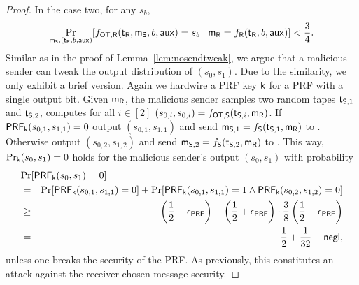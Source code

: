\begin{proof}
In the case two, for any $s_b$,
$$
\Pr_{\mathsf{m}_{\mathsf{S}}, (\mathsf{t}_{\mathsf{R}},b,\mathsf{aux})}[f_{\mathsf{OT},\mathsf{R}}(\mathsf{t}_{\mathsf{R}},\mathsf{m}_{\mathsf{S}},b,\mathsf{aux})=s_b\mid \mathsf{m}_{\mathsf{R}}=f_{\mathsf{R}}(\mathsf{t}_{\mathsf{R}},b,\mathsf{aux})]<\frac{3}{4}.
$$
Similar as in the proof of Lemma~\ref{lem:nosendtweak}, we argue that a malicious sender can tweak the output distribution of $(s_0,s_1)$. Due to the similarity, we only exhibit a brief version. Again we hardwire a PRF key $\mathsf{k}$ for a PRF with a single output bit. Given $\mathsf{m}_{\mathsf{R}}$, the malicious sender samples two random tapes $\mathsf{t}_{\mathsf{S}, 1}$ and $\mathsf{t}_{\mathsf{S},2}$, computes for all $i\in[2]$ $(s_{0,i},s_{0,i})=f_{\mathsf{OT},\mathsf{S}}(\mathsf{t}_{\mathsf{S},i},\mathsf{m}_{\mathsf{R}})$. If $\mathsf{PRF}_{\mathsf{k}}(s_{0,1},s_{1,1})=0$ output $(s_{0,1},s_{1,1})$ and send $\mathsf{m}_{\mathsf{S},1}=f_{\mathsf{S}}(\mathsf{t}_{\mathsf{S},1},\mathsf{m}_{\mathsf{R}})$ to \rec. Otherwise output $(s_{0,2},s_{1,2})$ and send $\mathsf{m}_{\mathsf{S},2}=f_{\mathsf{S}}(\mathsf{t}_{\mathsf{S},2},\mathsf{m}_{\mathsf{R}})$ to \rec. This way, $\Pr_{\mathsf{k}}(s_0,s_1)=0$ holds for the malicious sender's output $(s_0,s_1)$ with probability 
\begin{eqnarray*}
\lefteqn{\Pr[\PRF_{\key}(s_0,s_1)=0]}\\
&=&\Pr[\PRF_{\key}(s_{0,1},s_{1,1})=0]+\Pr[\PRF_{\key}(s_{0,1},s_{1,1})=1\wedge\PRF_{\key}(s_{0,2},s_{1,2})=0]\\
&\geq&  \left(\frac{1}{2}-\epsilon_{\PRF}\right)+\left(\frac{1}{2}+\epsilon_{\PRF}\right)\cdot\frac{3}{8}\left(\frac{1}{2}-\epsilon_{\PRF}\right)\\
&=& \frac{1}{2}+\frac{1}{32}-\negl,
\end{eqnarray*}
unless one breaks the security of the PRF. As previously, this constitutes an attack against the receiver chosen message security.
\pe
\end{proof}



